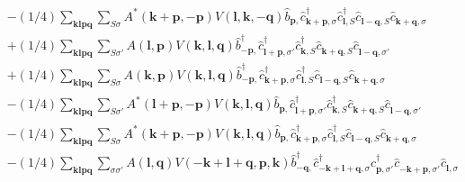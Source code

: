 \begin{align*}
	&-(1/4) \sum_{ \mathbf{k} \mathbf{l} \mathbf{p} \mathbf{q} } \sum_{ S \sigma } A^*( \mathbf{k}+\mathbf{p}, -\mathbf{p} )  V( \mathbf{l}, \mathbf{k}, -\mathbf{q} )   \hat{b}_{ \mathbf{p}, }^{\phantom{\dagger}} \hat{c}_{ \mathbf{k}+\mathbf{p}, \sigma }^\dagger  \hat{c}_{ \mathbf{l}, S }^\dagger  \hat{c}_{ \mathbf{l}-\mathbf{q}, S }^{\phantom{\dagger}} \hat{c}_{ \mathbf{k}+\mathbf{q}, \sigma }^{\phantom{\dagger}}  \\
	&+(1/4) \sum_{ \mathbf{k} \mathbf{l} \mathbf{p} \mathbf{q} } \sum_{ S \sigma' } A( \mathbf{l}, \mathbf{p} )  V( \mathbf{k}, \mathbf{l}, \mathbf{q} )   \hat{b}_{ -\mathbf{p}, }^\dagger  \hat{c}_{ \mathbf{l}+\mathbf{p}, \sigma' }^\dagger  \hat{c}_{ \mathbf{k}, S }^\dagger  \hat{c}_{ \mathbf{k}+\mathbf{q}, S }^{\phantom{\dagger}} \hat{c}_{ \mathbf{l}-\mathbf{q}, \sigma' }^{\phantom{\dagger}}  \\
	&+(1/4) \sum_{ \mathbf{k} \mathbf{l} \mathbf{p} \mathbf{q} } \sum_{ S \sigma } A( \mathbf{k}, \mathbf{p} )  V( \mathbf{k}, \mathbf{l}, \mathbf{q} )   \hat{b}_{ -\mathbf{p}, }^\dagger  \hat{c}_{ \mathbf{k}+\mathbf{p}, \sigma }^\dagger  \hat{c}_{ \mathbf{l}, S }^\dagger  \hat{c}_{ \mathbf{l}-\mathbf{q}, S }^{\phantom{\dagger}} \hat{c}_{ \mathbf{k}+\mathbf{q}, \sigma }^{\phantom{\dagger}}  \\
	&-(1/4) \sum_{ \mathbf{k} \mathbf{l} \mathbf{p} \mathbf{q} } \sum_{ S \sigma' } A^*( \mathbf{l}+\mathbf{p}, -\mathbf{p} )  V( \mathbf{k}, \mathbf{l}, \mathbf{q} )   \hat{b}_{ \mathbf{p}, }^{\phantom{\dagger}} \hat{c}_{ \mathbf{l}+\mathbf{p}, \sigma' }^\dagger  \hat{c}_{ \mathbf{k}, S }^\dagger  \hat{c}_{ \mathbf{k}+\mathbf{q}, S }^{\phantom{\dagger}} \hat{c}_{ \mathbf{l}-\mathbf{q}, \sigma' }^{\phantom{\dagger}}  \\
	&-(1/4) \sum_{ \mathbf{k} \mathbf{l} \mathbf{p} \mathbf{q} } \sum_{ S \sigma } A^*( \mathbf{k}+\mathbf{p}, -\mathbf{p} )  V( \mathbf{k}, \mathbf{l}, \mathbf{q} )   \hat{b}_{ \mathbf{p}, }^{\phantom{\dagger}} \hat{c}_{ \mathbf{k}+\mathbf{p}, \sigma }^\dagger  \hat{c}_{ \mathbf{l}, S }^\dagger  \hat{c}_{ \mathbf{l}-\mathbf{q}, S }^{\phantom{\dagger}} \hat{c}_{ \mathbf{k}+\mathbf{q}, \sigma }^{\phantom{\dagger}}  \\
	&-(1/4) \sum_{ \mathbf{k} \mathbf{l} \mathbf{p} \mathbf{q} } \sum_{ \sigma \sigma' } A( \mathbf{l}, \mathbf{q} )  V( -\mathbf{k}+\mathbf{l}+\mathbf{q}, \mathbf{p}, \mathbf{k} )   \hat{b}_{ -\mathbf{q}, }^\dagger  \hat{c}_{ -\mathbf{k}+\mathbf{l}+\mathbf{q}, \sigma }^\dagger  \hat{c}_{ \mathbf{p}, \sigma' }^\dagger  \hat{c}_{ -\mathbf{k}+\mathbf{p}, \sigma' }^{\phantom{\dagger}} \hat{c}_{ \mathbf{l}, \sigma }^{\phantom{\dagger}}  \\

\end{align*}
